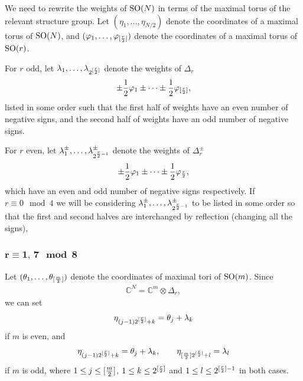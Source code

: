 \documentclass[10pt,a4paper]{amsart}
\numberwithin{equation}{section}
\begin{document}
We need to rewrite the weights of ${\rm SO}(N)$ in terms of the maximal torus of the relevant structure group. Let $(\eta_1,\dots, \eta_{N/2})$ denote the coordinates of a maximal torus of ${\rm SO}(N)$, and $(\varphi_1,\dots,\varphi_{[{r\over 2}]})$ denote the coordinates of a maximal torus of ${\rm SO}(r)$.

For $r$ odd, let $\lambda_1,\dots,\lambda_{2^{[{r\over 2}]}}$ denote the weights of $\Delta_r$
\begin{gather*}\pm {1\over 2}\varphi_1\pm\cdots\pm {1\over 2}\varphi_{[{r\over 2}]},\end{gather*}
listed in some order such that the f\/irst half of weights have an even number of negative signs, and the second half of weights have an odd number of negative signs.

For $r$ even, let $\lambda_1^\pm,\dots,\lambda_{2^{{r\over 2}-1}}^\pm$ denote the weights of $\Delta_r^\pm$
\begin{gather*}\pm {1\over 2}\varphi_1\pm\cdots\pm {1\over 2}\varphi_{{r\over 2}},\end{gather*}
which have an even and odd number of negative signs respectively. If $r \equiv 0 \mod 4$ we will be considering $\lambda_1^\pm,\dots,\lambda_{2^{{r\over 2}-1}}^\pm$ to be listed in some order so that the f\/irst and second halves are interchanged by ref\/lection (changing all the signs),

\subsubsection[$r\equiv1,\, 7 \mod 8$]{$\boldsymbol{r\equiv1,\,7 \mod 8}$}
Let $(\theta_1,\dots,\theta_{[{m\over2}]})$ denote the coordinates of maximal tori of ${\rm SO}(m)$. Since
\begin{gather*}\mathbb{C}^N=\mathbb{C}^{m}\otimes \Delta_r,\end{gather*}
we can set
\begin{gather*}
 \eta_{(j-1)2^{[{r\over 2}]}+k}= \theta_j + \lambda_k
\end{gather*}
 if $m$ is even, and
\begin{gather*}
 \eta_{(j-1)2^{[{r\over 2}]}+k}= \theta_j + \lambda_k, \qquad
 \eta_{[{m\over2}]2^{[{r\over 2}]}+l}= \lambda_l
\end{gather*}
if $m$ is odd, where $1\leq j\leq [{m\over 2}]$, $1\leq k \leq 2^{[{r\over 2}]}$ and $1\leq l \leq 2^{[{r\over 2}]-1}$ in both cases.
\end{document}
